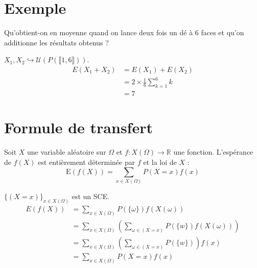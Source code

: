 \documentclass[../main.tex]{subfiles}
\begin{document}
\section{Exemple}
\begin{tcolorbox}[title=Exemple 33.7, title filled=false, colframe=darkgreen, colback=darkgreen!10!white]
    Qu'obtient-on en moyenne quand on lance deux fois un dé à 6 faces et qu'on additionne les résultats obtenus ?
\end{tcolorbox}

\noindent $X_1, X_2 \hookrightarrow \mathcal{U}(P(\llbracket 1, 6 \rrbracket))$. 
\begin{align*}
    E(X_1 + X_2) &= E(X_1) + E(X_2) \\
    &= 2\times \frac{1}{6} \sum_{k=1}^{6} k \\
    &= 7
\end{align*}

\section{Formule de transfert}
\begin{tcolorbox}[title=Théorème 33.8, title filled=false, colframe=orange, colback=orange!10!white]
    Soit $X$ une variable aléatoire sur $\Omega$ et $f: X(\Omega) \rightarrow \mathbb{R}$ une fonction. L'espérance de $f(X)$ est entièrement déterminée par $f$ et la loi de $X$ :
    $$\mathrm{E}(f(X))=\sum_{x \in X(\Omega)} P(X=x) f(x)$$
\end{tcolorbox}

\noindent $\{(X = x)\}_{x\in X(\Omega)}$ est un SCE. 
\begin{align*}
    E(f(X)) &= \sum_{x\in X(\Omega)} P(\{\omega\}) f(X(\omega)) \\
    &= \sum_{x\in X(\Omega)} \left( \sum_{\omega\in (X=x)} P(\{w\}) f(X(\omega)) \right) \\
    &= \sum_{x\in X(\Omega)} \left( \sum_{\omega\in (X = x)} P(\{w\}) \right) f(x) \\
    &= \sum_{x\in X(\Omega)} P(X=x) f(x)
\end{align*}
\end{document}
